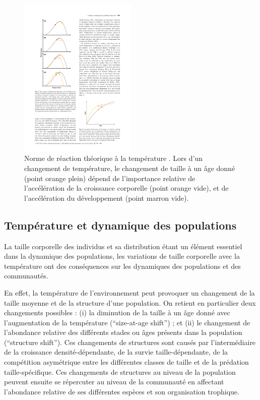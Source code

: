 \begin{figure}[!t] %
\centering
\includegraphics[width=0.5\textwidth]{1_CorpsDeThese/EA/Fig/ThermalNorm}
\caption[
Norme de réaction à la température]{Norme de réaction théorique à la
température \autocites[Figure 2]{ohlberger2013a}. Lors d'un changement de
température, le changement de taille à un âge donné (point orange plein) dépend
de l'importance relative de l'accélération de la croissance corporelle (point
orange vide), et de l'accélération du développement (point marron vide).}
\label{Fig:EA2}
\end{figure}

\subsection{Température et dynamique des populations}

La taille corporelle des individus et sa distribution étant un élément essentiel
dans la dynamique des populations, les variations de taille corporelle avec la
température ont des conséquences sur les dynamiques des populations et des
communautés. 

En effet, la température de l'environnement peut provoquer un changement de la
taille moyenne et de la structure d'une population. On retient en particulier
deux changements possibles : (i) la diminution de la taille à un âge donné avec
l'augmentation de la température (``size-at-age shift'') ; et (ii) le
changement de l'abondance relative des différents stades ou âges présents dans
la population (``structure shift''). Ces changements de structures sont causés
par l'intermédiaire de la croissance densité-dépendante, de la survie
taille-dépendante, de la compétition asymétrique entre les différentes
classes de taille et de la prédation taille-spécifique. Ces changements de
structures au niveau de la population peuvent ensuite se répercuter au niveau de
la communauté en affectant l'abondance relative de ses différentes espèces et son
organisation trophique. 

